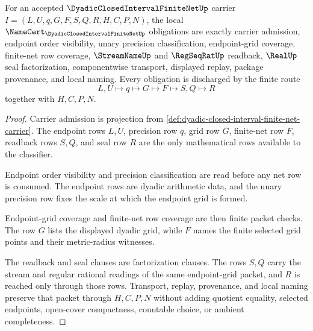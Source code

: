 \begin{theorem}
\label{thm:dyadic-closed-interval-finite-net-namecert-obligations}
For an accepted $\DyadicClosedIntervalFiniteNetUp$ carrier $I=(L,U,q,G,F,S,Q,R,H,C,P,N)$, the local $\NameCert_{\DyadicClosedIntervalFiniteNetUp}$ obligations are exactly carrier admission, endpoint order visibility, unary precision classification, endpoint-grid coverage, finite-net row coverage, $\StreamNameUp$ and $\RegSeqRatUp$ readback, $\RealUp$ seal factorization, componentwise transport, displayed replay, package provenance, and local naming. Every obligation is discharged by the finite route
$$
L,U\longmapsto q\longmapsto G\longmapsto F\longmapsto S,Q\longmapsto R
$$
together with $H,C,P,N$.
\end{theorem}
\begin{proof}
Carrier admission is projection from \autoref{def:dyadic-closed-interval-finite-net-carrier}. The endpoint rows $L,U$, precision row $q$, grid row $G$, finite-net row $F$, readback rows $S,Q$, and seal row $R$ are the only mathematical rows available to the classifier.

Endpoint order visibility and precision classification are read before any net row is consumed. The endpoint rows are dyadic arithmetic data, and the unary precision row fixes the scale at which the endpoint grid is formed.

Endpoint-grid coverage and finite-net row coverage are then finite packet checks. The row $G$ lists the displayed dyadic grid, while $F$ names the finite selected grid points and their metric-radius witnesses.

The readback and seal clauses are factorization clauses. The rows $S,Q$ carry the stream and regular rational readings of the same endpoint-grid packet, and $R$ is reached only through those rows. Transport, replay, provenance, and local naming preserve that packet through $H,C,P,N$ without adding quotient equality, selected endpoints, open-cover compactness, countable choice, or ambient completeness.
\end{proof}


